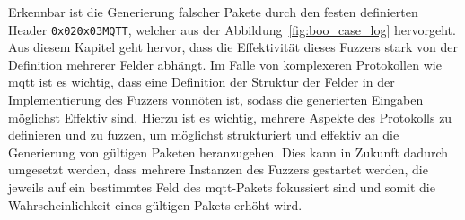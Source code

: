 \noindent Erkennbar ist die Generierung falscher Pakete durch den festen definierten Header \texttt{0x020x03MQTT}, welcher aus der
Abbildung~\ref{fig:boo_case_log} hervorgeht.\newline\newline
Aus diesem Kapitel geht hervor, dass die Effektivität dieses Fuzzers stark von der Definition mehrerer Felder abhängt.
Im Falle von komplexeren Protokollen wie \gls{mqtt} ist es wichtig, dass eine Definition der Struktur der Felder in
der Implementierung des Fuzzers vonnöten ist, sodass die generierten Eingaben möglichst Effektiv sind.
Hierzu ist es wichtig, mehrere Aspekte des Protokolls zu definieren und zu fuzzen, um möglichst strukturiert und effektiv
an die Generierung von gültigen Paketen heranzugehen.
Dies kann in Zukunft dadurch umgesetzt werden, dass mehrere Instanzen des Fuzzers gestartet werden, die jeweils auf ein
bestimmtes Feld des \gls{mqtt}-Pakets fokussiert sind und somit die Wahrscheinlichkeit eines gültigen Pakets erhöht wird.